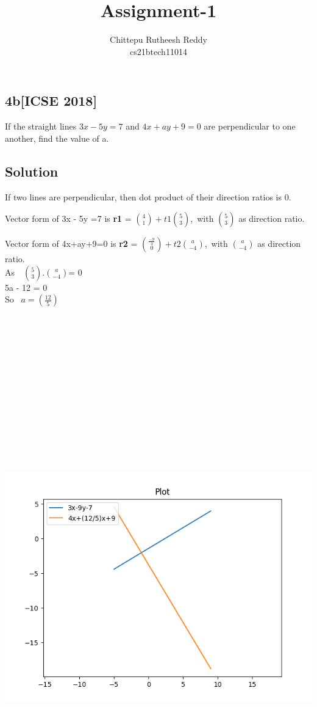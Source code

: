 \documentclass[journal,12pt,twocolumn]{IEEEtran}
\title{\textbf{Assignment-1}}
\author{Chittepu Rutheesh Reddy \\
  cs21btech11014}
\begin{document}
\maketitle{}

\subsection*{\textbf{4b[ICSE 2018]}}
If the straight lines $3x- 5y = 7$ and $4x+ ay+ 9 = 0$ are perpendicular to one 
another, find the value of a.

\subsection*{\textbf{Solution}}
If two lines are perpendicular, then dot product of their direction ratios is 0.
\bigskip

 Vector form of 3x - 5y =7 is \textbf{r1} = $\binom{4}{1} + t1\binom{5}{3}$,\, with $\binom{5}{3}$ as direction ratio.
 \bigskip
   
 Vector form of 4x+ay+9=0 is \textbf{r2} = $\binom{\frac{-9}{4}}{0} + t2\binom{a}{-4}$,\, with $\binom{a}{-4}$ as direction ratio.
  \\
   
   As  \,\,  $\binom{5}{3}$.$\binom{a}{-4}$= 0
   \\ 
   
    5a - 12 = 0 
  \\
 
   So  \,  $a = (\frac{12}{5})$ \\
   \\\\\\\\\\\\\\\\\\\\\\\\\\
  
  \graphicspath{{D:/Semester 2/Probability and Random Variables AI1110/Assignments/1/}}   
\includegraphics[scale=0.6]{Figure_1}
\end{document}
